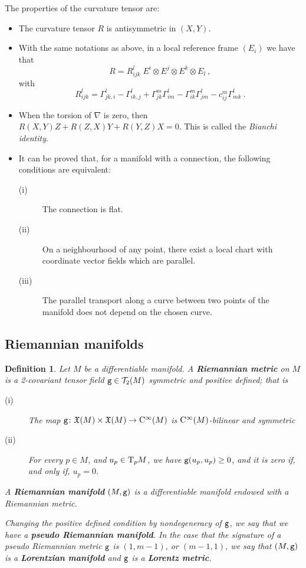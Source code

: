 \documentclass[12pt]{report}
\newtheorem{definition}[teor]{Definition}
\def\vf{\mathfrak X}
\def\Tan{{\rm T}}
\def\Cinfty{{\rm C}^\infty}
\begin{document}
 The properties of the curvature tensor are:
\begin{itemize}
\item
The curvature tensor ${\mathit R}$ is antisymmetric in $(X,Y)$. 
  \item 
With the same notations as above,
in a local reference frame $(E_i)$ we have that 
 $$
 {\mathit R}={\mathit R}_{ijk}^l\; E^i\otimes  E^j\otimes E^k\otimes E_l \ ,
 $$
 with
 $$
 {\mathit R}_{ijk}^l=\Gamma_{jk,i}^l-\Gamma_{ik,j}^l+\Gamma_{jk}^m\Gamma_{im}^l-\Gamma_{ik}^m\Gamma_{jm}^l-c_{ij}^m\Gamma_{mk}^l \ .
 $$
  \item 
When the torsion of $\nabla$ is zero, then ${\mathit R}(X,Y)Z+{\mathit R}(Z,X)Y+{\mathit R}(Y,Z)X=0$. This is called the {\sl Bianchi identity}.
  \item 
It can be proved that, for a manifold with a connection,
the following conditions are equivalent:
  \begin{description}
  \item[{\rm (i)}] The connection is flat.
  \item[{\rm (ii)}] On a neighbourhood of any point, there exist a local chart with coordinate vector fields which are parallel.
  \item[{\rm (iii)}] The parallel transport along a curve between two points of the manifold  does not depend on the chosen curve.
  \end{description}
\end{itemize}


\subsection{Riemannian manifolds}
\label{Riemann}


\begin{definition}
Let $M$ be a differentiable manifold. 
A \textbf{Riemannian metric} on $M$ is a 2-covariant tensor field 
${\tt g}\in {\mathcal T}_2(M)$ symmetric and positive defined;
that is
\begin{description}
  \item[{\rm (i)}] The map ${\tt g}\colon\vf(M)\times \vf(M)\to\Cinfty(M)$ 
  is $\Cinfty(M)$-bilinear and symmetric 
  \item[{\rm (ii)}] For every $p\in M$, and $u_p\in\Tan_p M$, 
we have ${\tt g}(u_p,u_p)\geq 0$, and it is zero if, and only if, $u_p=0$.
\end{description}
A \textbf{Riemannian manifold} $(M,{\tt g})$ is a differentiable manifold endowed with a Riemannian metric.

Changing the positive defined condition by nondegeneracy of ${\tt g}$, 
we say that we have a \textbf{pseudo Riemannian  manifold}. 
In the case that the signature of a pseudo Riemannian metric ${\tt g}$ 
is $(1,m-1)$, or $(m-1,1)$, we say that $(M,{\tt g})$ is a 
\textbf{Lorentzian manifold} and ${\tt g}$ is a \textbf{Lorentz metric}.
\end{definition}
\end{document}
